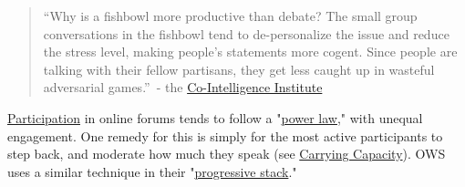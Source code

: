 \begin{quote}
``Why is a fishbowl more productive than debate? The small group
conversations in the fishbowl tend to de-personalize the issue and
reduce the stress level, making people's statements more cogent. Since
people are talking with their fellow partisans, they get less caught up
in wasteful adversarial games.''~- the
\href{http://www.co-intelligence.org/y2k\_fishbowl.html}{Co-Intelligence
Institute}
\end{quote}

\href{http://peeragogy.org/organizing-a-learning-context/participation/}{Participation}
in online forums tends to follow a
"\href{http://en.wikipedia.org/wiki/Power\_law}{power law}," with
unequal engagement. One remedy for this is simply for the most active
participants to step back, and moderate how much they speak (see
\href{http://peeragogy.org/patterns-usecases/patterns-and-heuristics/carrying-capacity/}{Carrying
Capacity}). OWS uses a similar technique in their
"\href{http://en.wikipedia.org/wiki/Progressive\_stack}{progressive
stack}."
